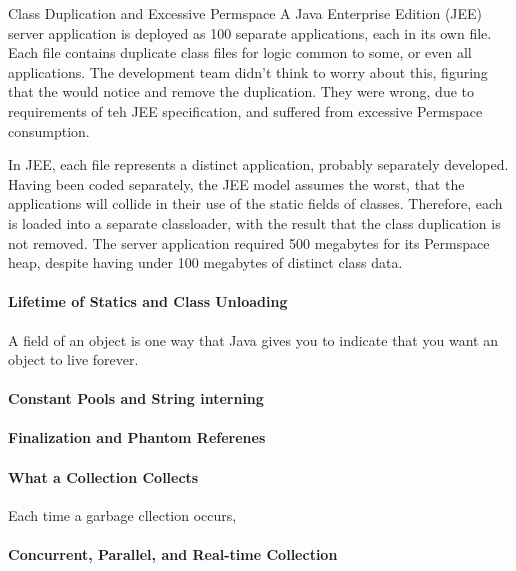 \begin{example}{Class Duplication and Excessive Permspace}
A Java Enterprise Edition (JEE) server application is deployed as 100 separate
applications, each in its own  file. Each  file contains
duplicate class files for logic common to some, or even all applications.
The development team didn't think to worry about this, figuring that the
\jre would notice and remove the duplication. They were wrong, due to
requirements of teh JEE specification, and suffered from excessive Permspace
consumption.

In JEE, each  file represents a distinct application, probably
separately developed. Having been coded separately, the JEE model assumes the
worst, that the applications will collide in their use of the static fields of
classes. Therefore, each  is loaded into a separate classloader, with
the result that the class duplication is not removed. The server application
required 500 megabytes for its Permspace heap, despite having under 100 megabytes
of distinct class data.
\end{example}

\paragraph{Lifetime of Statics and Class Unloading}

A  field of an object is one way that Java gives you to indicate
that you want an object to live forever.


\paragraph{Constant Pools and String interning}

\paragraph{Finalization and Phantom Referenes}


\paragraph{What a Collection Collects}
Each time a garbage cllection occurs, 

\paragraph{Concurrent, Parallel, and Real-time Collection}


